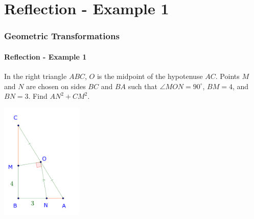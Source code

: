 \documentclass[8pt,xcolor=table,dvipsnames]{beamer}
\newcommand{\dg}{^\circ}
\begin{document}
\section{Reflection - Example 1}

\begin{frame}[t]
    \frametitle{Geometric Transformations}
    \framesubtitle{Reflection - Example 1}
    \begin{example}
        In the right triangle $ABC$, $O$ is the midpoint of the hypotenuse $AC$.
        Points $M$ and $N$ are chosen on sides $BC$ and $BA$ such that $\angle MON = 90\dg$, $BM=4$, and $BN=3.$
        Find $AN^2 + CM^2$.
    \end{example}
    \begin{center}
        \includegraphics[width=3.9cm]{./svg/pdf/hc-2021-sm2-s2-p3-3.pdf}
    \end{center}
\end{frame}
\end{document}
